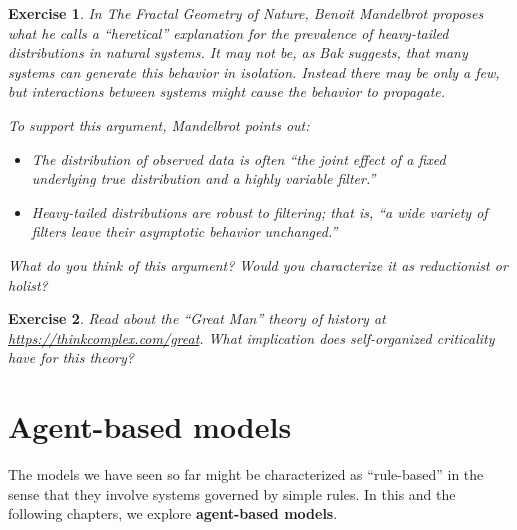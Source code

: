 \documentclass[12pt]{book}
\theoremstyle{exercise}
\newtheorem{exercise}{Exercise}[chapter]
\begin{document}
\begin{exercise}

In {\it The Fractal Geometry of Nature}, Benoit Mandelbrot proposes
what he calls a ``heretical'' explanation for the prevalence of
heavy-tailed distributions in natural systems.  It may not
be, as Bak suggests, that many systems can generate this behavior in
isolation.  Instead there may be only a few, but interactions between systems might cause the behavior to propagate.


To support this argument, Mandelbrot points out:

\begin{itemize}

\item The distribution of observed data is often ``the joint
  effect of a fixed underlying {\em true distribution} and a highly
  variable {\em filter}.''

\item Heavy-tailed distributions are robust to filtering; that is,
  ``a wide variety of filters leave their asymptotic behavior
  unchanged.''

\end{itemize}

What do you think of this argument?  Would you characterize
it as reductionist or holist?


\end{exercise}


\begin{exercise}

Read about the ``Great Man'' theory of history at
\url{https://thinkcomplex.com/great}.  What implication
does self-organized criticality have for this theory?

\end{exercise}



\chapter{Agent-based models}
\label{agent-based}

The models we have seen so far might be characterized as ``rule-based''
in the sense that they involve systems governed by simple rules.  In this
and the following chapters, we explore {\bf agent-based models}.
\end{document}
